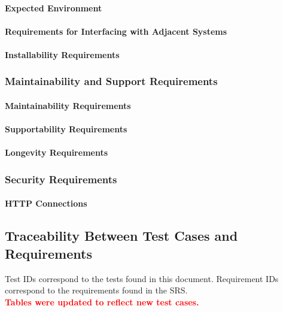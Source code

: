 \documentclass[12pt, titlepage]{article}
\begin{document}
\paragraph{Expected Environment}

\paragraph{Requirements for Interfacing with Adjacent Systems}


\paragraph{Installability Requirements}



\subsubsection{Maintainability and Support Requirements}
\paragraph{Maintainability Requirements}


\paragraph{Supportability Requirements}


\paragraph{Longevity Requirements}


\subsubsection{Security Requirements}
\paragraph{HTTP Connections}


\newpage

\subsection{Traceability Between Test Cases and Requirements}
\noindent Test IDs correspond to the tests found in this document. Requirement IDs correspond to the requirements found in the SRS. \\
\textcolor{red}{\textbf{Tables were updated to reflect new test cases.}}
\end{document}
